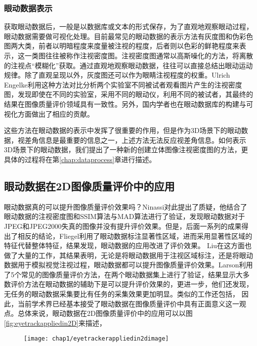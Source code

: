 \subsubsection{眼动数据表示}
\label{eyetrackdatarepresentation}
获取眼动数据后，一般是以数据库或文本的形式保存，为了直观地观察眼动过程，眼动数据需要做可视化处理。目前最常见的眼动数据的表示方法有灰度图和伪彩色图两大类，前者以明暗程度来度量被注视的程度，后者则以色彩的鲜艳程度来表示，这一类图往往被称作注视密度图。注视密度图通常以高斯噪化的方法，将离散的注视点“模糊化”获取\parencite{wang2013computational}。通过直观地观察眼动数据，往往可以直接总结出眼动运动规律\parencite{kim2014saliency}。除了直观呈现以外，灰度图还可以作为眼睛注视程度的权重。Ulrich Engelke利用这种方法对比分析两个实验室不同被试者观看图片产生的注视密度图，发现即使在不同的实验室，采用不同的眼动仪，利用不同的被试者，其最终的结果在图像质量评价领域具有一致性\parencite{engelke2013comparative}。另外，国内学者也在眼动数据库的构建与可视化方面做出了相应的贡献\parencite{zhang2014dataset}。

这些方法在眼动数据的表示中发挥了很重要的作用，但是作为3D场景下的眼动数据，视差角信息是最重要的信息之一，上述方法无法反应视差角信息。如何表示3D场景下的眼动数据，我们提出了一种新的创建立体图像注视密度图的方法\parencite{ma2015new}，更具体的过程将在第\ref{chap:dataprocess}章进行描述。
\subsection{眼动数据在2D图像质量评价中的应用}
\label{eyetrackapplied2D}
眼动数据真的可以提升图像质量评价效果吗？Ninassi对此提出了质疑\parencite{ninassi2007does}，他结合了眼动数据的注视密度图和SSIM算法与MAD算法进行了验证，发现眼动数据对于JPEG和JPEG2000失真的图像并没有提升评价效果。但是，后面一系列的成果得出了相反的结论，Fliegel利用了眼动数据标注显著性区域\parencite{fliegel2008eyetracking}，进而采用显著性区域的特征代替整体特征，结果发现，眼动数据的应用改进了评价效果。
Liu在这方面也做了大量的工作\parencite{alers2009using,liu2009studying,liu2011visual}，其结果表明，无论是将眼动数据用于注视区域标注，还是将眼动数据用于模拟视觉注视过程，眼动数据都可以提升图像质量评价效果。Larson\parencite{larson2008can}利用了5个常见的图像质量评价方法，在两个眼动数据集上进行了验证，结果显示大多数评价方法在眼动数据的辅助下是可以提升评价效果的，更进一步，他们还发现，无任务的眼动数据采集要比有任务的采集效果更加明显。类似的工作还包括\parencite{gide2012comparative}，
因此，当前学术界已经基本接受了眼动数据在图像质量评价中具有正面意义这一观点。总体来说，眼动数据在2D图像质量评价中的应用可以以图\ref{fig:eyetrackappliedin2D}来描述，\begin{figure}[ht]
  \centering
  \texttt{[image: chap1/eyetrackerappliedin2dimage]}
\end{figure}

